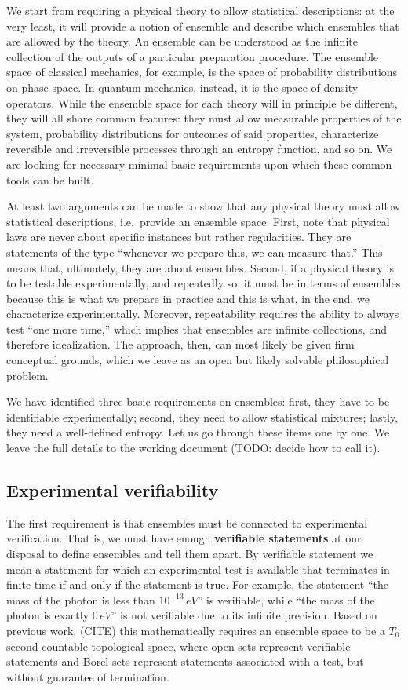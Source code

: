 \documentclass[10pt,twocolumn, nofootinbib]{revtex4-2}
\begin{document}
We start from requiring a physical theory to allow statistical descriptions: at the very least, it will provide a notion of ensemble and describe which ensembles that are allowed by the theory. An ensemble can be understood as the infinite collection of the outputs of a particular preparation procedure. The ensemble space of classical mechanics, for example, is the space of probability distributions on phase space. In quantum mechanics, instead, it is the space of density operators. While the ensemble space for each theory will in principle be different, they will all share common features: they must allow measurable properties of the system, probability distributions for outcomes of said properties, characterize reversible and irreversible processes through an entropy function, and so on. We are looking for necessary minimal basic requirements upon which these common tools can be built.

At least two arguments can be made to show that any physical theory must allow statistical descriptions, i.e.~provide an ensemble space. First, note that physical laws are never about specific instances but rather regularities. They are statements of the type ``whenever we prepare this, we can measure that.'' This means that, ultimately, they are about ensembles. Second, if a physical theory is to be testable experimentally, and repeatedly so, it must be in terms of ensembles because this is what we prepare in practice and this is what, in the end, we characterize experimentally. Moreover, repeatability requires the ability to always test ``one more time,'' which implies that ensembles are infinite collections, and therefore idealization. The approach, then, can most likely be given firm conceptual grounds, which we leave as an open but likely solvable philosophical problem.

We have identified three basic requirements on ensembles: first, they have to be identifiable experimentally; second, they need to allow statistical mixtures; lastly, they need a well-defined entropy. Let us go through these items one by one. We leave the full details to the working document (TODO: decide how to call it).

\subsection{Experimental verifiability}
The first requirement is that ensembles must be connected to experimental verification. That is, we must have enough \textbf{verifiable statements} at our disposal to define ensembles and tell them apart. By verifiable statement we mean a statement for which an experimental test is available that terminates in finite time if and only if the statement is true. For example, the statement ``the mass of the photon is less than $10^{-13} \, eV$'' is verifiable, while ``the mass of the photon is exactly $0 \, eV$'' is not verifiable due to its infinite precision. Based on previous work, (CITE) this mathematically requires an ensemble space to be a $T_0$ second-countable topological space, where open sets represent verifiable statements and Borel sets represent statements associated with a test, but without guarantee of termination.
\end{document}
